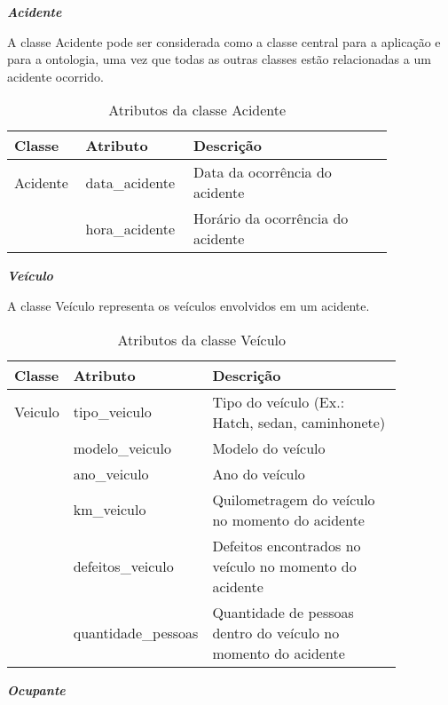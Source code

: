 \noindent
\emph{\textbf{Acidente}}

  A classe Acidente pode ser considerada como a classe central para a aplicação e para a ontologia,
  uma vez que todas as outras classes estão relacionadas a um acidente ocorrido.
  
    \begin{table*}[!h]
    \centering
    \begin{tabular}{p{0.15\linewidth}p{0.2\linewidth}p{0.5\linewidth}}
      \hline
      \textbf{Classe} & \textbf{Atributo} & \textbf{Descrição}\\
      \hline
	Acidente & data\_acidente & Data da ocorrência do acidente\\
		  & hora\_acidente & Horário da ocorrência do acidente\\ 
      \hline
    \end{tabular}
    \caption{Atributos da classe Acidente}
    \label{tab:attr_acidente}
    \end{table*}
    
\noindent
\emph{\textbf{Veículo}}

  A classe Veículo representa os veículos envolvidos em um acidente.
  
    \begin{table*}[!h]
    \centering
    \begin{tabular}{p{0.15\linewidth}p{0.22\linewidth}p{0.5\linewidth}}
      \hline
      \textbf{Classe} & \textbf{Atributo} & \textbf{Descrição}\\
      \hline
	Veiculo & tipo\_veiculo & Tipo do veículo (Ex.: Hatch, sedan, caminhonete)\\
		& modelo\_veiculo & Modelo do veículo\\
		& ano\_veiculo & Ano do veículo\\		
		& km\_veiculo & Quilometragem do veículo no momento do acidente\\
		& defeitos\_veiculo & Defeitos encontrados no veículo no momento do acidente\\
		& quantidade\_pessoas & Quantidade de pessoas dentro do veículo no momento do acidente\\
      \hline
    \end{tabular}
    \caption{Atributos da classe Veículo}
    \label{tab:attr_veiculo}
    \end{table*}

\vfill
\pagebreak

\noindent
\emph{\textbf{Ocupante}}

